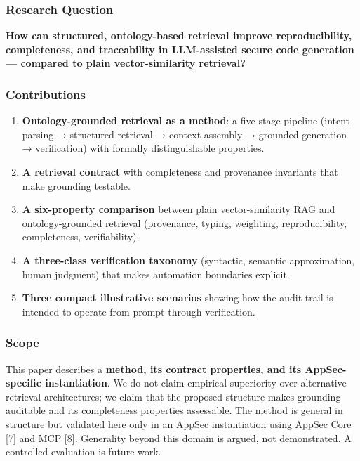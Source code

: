 \documentclass[
]{article}
\begin{document}
\subsubsection{Research Question}\label{research-question}

\textbf{How can structured, ontology-based retrieval improve
reproducibility, completeness, and traceability in LLM-assisted secure
code generation --- compared to plain vector-similarity retrieval?}

\subsubsection{Contributions}\label{contributions}

\begin{enumerate}
\def\labelenumi{\arabic{enumi}.}
\item
  \textbf{Ontology-grounded retrieval as a method}: a five-stage
  pipeline (intent parsing → structured retrieval → context assembly →
  grounded generation → verification) with formally distinguishable
  properties.
\item
  \textbf{A retrieval contract} with completeness and provenance
  invariants that make grounding testable.
\item
  \textbf{A six-property comparison} between plain vector-similarity RAG
  and ontology-grounded retrieval (provenance, typing, weighting,
  reproducibility, completeness, verifiability).
\item
  \textbf{A three-class verification taxonomy} (syntactic, semantic
  approximation, human judgment) that makes automation boundaries
  explicit.
\item
  \textbf{Three compact illustrative scenarios} showing how the audit
  trail is intended to operate from prompt through verification.
\end{enumerate}

\subsubsection{Scope}\label{scope}

This paper describes a \textbf{method, its contract properties, and its
AppSec-specific instantiation}. We do not claim empirical superiority
over alternative retrieval architectures; we claim that the proposed
structure makes grounding auditable and its completeness properties
assessable. The method is general in structure but validated here only
in an AppSec instantiation using AppSec Core {[}7{]} and MCP {[}8{]}.
Generality beyond this domain is argued, not demonstrated. A controlled
evaluation is future work.
\end{document}
